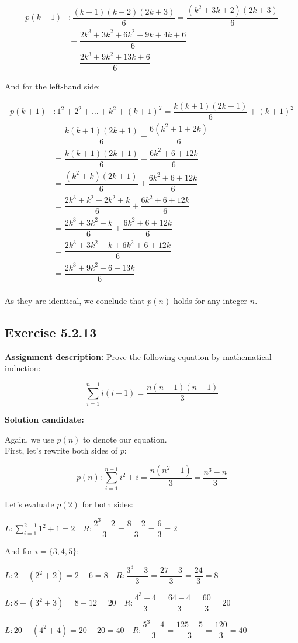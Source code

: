\documentclass{report}
\newcommand{\cent}[1]{\begin{center}#1\end{center}}
\newcommand{\mAlign}[1]{\begin{align*}#1\end{align*}}
\newcommand{\assignmentDescription}{\textbf{Assignment description: }}
\newcommand{\solution}{\textbf{Solution candidate: }}
\newcommand{\QED}{\boxed{}}
\newcommand{\Exercise}[1]{\subsection{Exercise #1}}
\begin{document}
 	\mAlign{p(k+1) &:  \dfrac{(k+1)(k+2)(2k+3)}{6} = \dfrac{(k^2+3k+2)(2k+3)}{6} \\
 							&= \dfrac{2k^3+3k^2 +6k^2 +9k + 4k+6 }{6}\\
 							&= \dfrac{2k^3+9k^2 + 13k+6 }{6}}
 	
 	And for the left-hand side:
 	
 	\mAlign{
 		p(k+1) &: 1^2 + 2^2 + \dots + k^2 + (k+1)^2 = \dfrac{k(k+1)(2k+1)}{6} + (k+1)^2\\
 		&= \dfrac{k(k+1)(2k+1)}{6} + \dfrac{6(k^2 + 1 +2k)}{6} \\
 		&= \dfrac{k(k+1)(2k+1)}{6} + \dfrac{6k^2 + 6 + 12k}{6} \\
 		&= \dfrac{(k^2+k)(2k+1)}{6} + \dfrac{6k^2 + 6 + 12k}{6} \\
 		&= \dfrac{2k^3+k^2+2k^2+k}{6} + \dfrac{6k^2 + 6 + 12k}{6}\\
 		&= \dfrac{2k^3+3k^2+k}{6} + \dfrac{6k^2 + 6 + 12k}{6}\\
 		&= \dfrac{2k^3+3k^2+k + 6k^2 + 6 + 12k}{6}\\
 		&= \dfrac{2k^3+9k^2 + 6 + 13k}{6}\\
 	}
 
 	As they are identical, we conclude that $p(n)$ holds for any integer $n$.\\
 	
 	\QED
 	
 	\Exercise{5.2.13}
 	
 	\assignmentDescription
 	Prove the following equation by mathematical induction:
 	
 	\cent{$$\sum_{i=1}^{n-1} i(i+1) = \dfrac{n(n-1)(n+1)}{3}$$}
 	
 	\solution
 	
 	Again, we use $p(n)$ to denote our equation.\\
 	
 	First, let's rewrite both sides of $p$:
 	
 	\cent{$$p(n) :  \sum_{i=1}^{n-1} i^2+i = \dfrac{n(n^2-1)}{3} = \dfrac{n^3-n}{3}$$}
 	
 	Let's evaluate $p(2)$ for both sides:
 	
 	\cent{$ L : \sum_{i=1}^{2-1} 1^2+1 = 2 \quad R : \dfrac{2^3-2}{3} = \dfrac{8-2}{3} = \dfrac{6}{3} = 2$}
 	
 	And for $i = \{3,4,5\}$:
 	
 	\cent{$L:  2+(2^2 +2) = 2+6 = 8 \quad R : \dfrac{3^3-3}{3} = \dfrac{27-3}{3} = \dfrac{24}{3} = 8$}
 	\cent{$L:  8+(3^2 +3) = 8+12 = 20 \quad R : \dfrac{4^3-4}{3} = \dfrac{64-4}{3} = \dfrac{60}{3} = 20$}
 	\cent{$L:  20+(4^2 +4) = 20+20 = 40 \quad R : \dfrac{5^3-4}{3} = \dfrac{125-5}{3} = \dfrac{120}{3} = 40$}
 	
\end{document}
